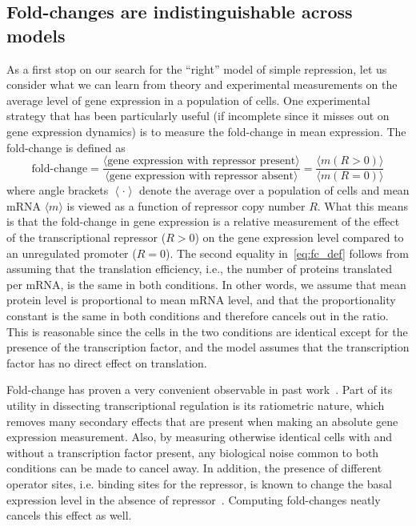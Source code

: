 
\subsection{Fold-changes are indistinguishable across models}
As a first stop on our search for the ``right'' model of simple repression, let
us consider what we can learn from theory and experimental measurements on the
average level of gene expression in a population of cells. One experimental
strategy that has been particularly useful (if incomplete since it misses out on
gene expression dynamics) is to measure the fold-change in mean expression. The
fold-change is defined as
\begin{equation}
\text{fold-change}
= \frac{\langle \text{gene expression with repressor present} \rangle}
        {\langle \text{gene expression with repressor absent} \rangle}
= \frac{\langle m (R > 0) \rangle}{\langle m (R = 0) \rangle}
\label{eq:fc_def}
\end{equation}
where angle brackets $\left\langle \cdot \right\rangle$ denote the average over
a population of cells and mean mRNA $\langle m\rangle$ is viewed as a function
of repressor copy number $R$. What this means is that the fold-change in gene
expression is a relative measurement of the effect of the transcriptional 
repressor ($R > 0$) on the gene expression level compared to an unregulated
promoter ($R = 0$). The second equality in~\ref{eq:fc_def} follows from assuming
that the translation efficiency, i.e., the number of proteins translated per
mRNA, is the same in both conditions. In other words, we assume that mean
protein level is proportional to mean mRNA level, and that the proportionality
constant is the same in both conditions and therefore cancels out in the ratio.
This is reasonable since the cells in the two conditions are identical except
for the presence of the transcription factor, and the model assumes that the
transcription factor has no direct effect on translation.

Fold-change has proven a very convenient observable in past
work~\cite{Garcia2011a, Razo-Mejia2018, Chure2019}. Part of its utility in
dissecting transcriptional regulation is its ratiometric nature, which removes
many secondary effects that are present when making an absolute gene expression
measurement. Also, by measuring otherwise identical cells with and without a
transcription factor present, any biological noise common to both conditions can
be made to cancel away. In addition, the presence of different operator sites,
i.e. binding sites for the repressor, is known to change the basal expression
level in the absence of repressor~. Computing fold-changes neatly cancels this
effect as well.

